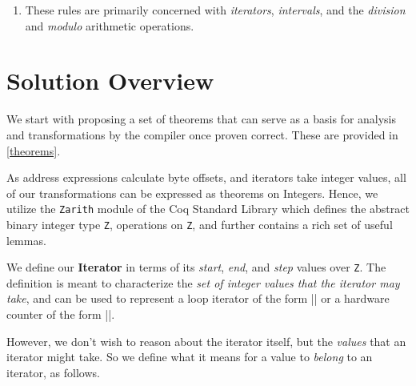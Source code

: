 \begin{enumerate}
\def\labelenumi{\arabic{enumi}.}
\setcounter{enumi}{2}
\tightlist
\item
  These rules are primarily concerned with \emph{iterators},
  \emph{intervals}, and the \emph{division} and \emph{modulo} arithmetic
  operations.
\end{enumerate}

\hypertarget{solution-overview}{%
\section{Solution Overview}\label{solution-overview}}

We start with proposing a set of theorems that can serve as a basis for
analysis and transformations by the compiler once proven correct. These
are provided in \autoref{theorems}.

As address expressions calculate byte offsets, and iterators take
integer values, all of our transformations can be expressed as theorems
on Integers. Hence, we utilize the \texttt{Zarith} module of the Coq
Standard Library which defines the abstract binary integer type
\texttt{Z}, operations on \texttt{Z}, and further contains a rich set of
useful lemmas.

We define our \textbf{Iterator} in terms of its \emph{start},
\emph{end}, and \emph{step} values over \texttt{Z}. The definition is
meant to characterize the \emph{set of integer values that the iterator
may take}, and can be used to represent a loop iterator of the form
\VERB|\KeywordTok{=}|
or a hardware counter of the form
\VERB||.

\begin{Shaded}
\begin{Highlighting}[]
\OperatorTok{:=}
    \OperatorTok{|}\OperatorTok{(}\OperatorTok{:}\OperatorTok{)}
\end{Highlighting}
\end{Shaded}

However, we don't wish to reason about the iterator itself, but the
\emph{values} that an iterator might take. So we define what it means
for a value to \emph{belong} to an iterator, as follows.

